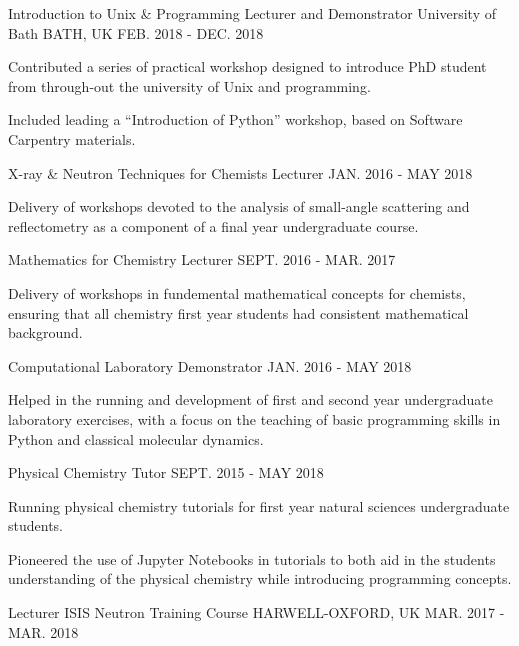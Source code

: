 \begin{cventries}
	\cventry
	{Introduction to Unix \& Programming Lecturer and Demonstrator}
	{University of Bath}
	{BATH, UK}
	{FEB. 2018 - DEC. 2018}
	{
		\begin{cvitems}
			\item {Contributed a series of practical workshop designed to introduce PhD student from through-out the university of Unix and programming.}
			\item {Included leading a ``Introduction of Python'' workshop, based on Software Carpentry materials. }
		\end{cvitems}
	}
	\cventry
	{X-ray \& Neutron Techniques for Chemists Lecturer}
	{}
	{}
	{JAN. 2016 - MAY 2018}
	{
		\begin{cvitems}
			\item {Delivery of workshops devoted to the analysis of small-angle scattering and reflectometry as a component of a final year undergraduate course.}
		\end{cvitems}
	}
	\cventry
	{Mathematics for Chemistry Lecturer}
	{}
	{}
	{SEPT. 2016 - MAR. 2017}
	{
		\begin{cvitems}
			\item {Delivery of workshops in fundemental mathematical concepts for chemists, ensuring that all chemistry first year students had consistent mathematical background.}
		\end{cvitems}
	}
	\cventry
	{Computational Laboratory Demonstrator}
	{}
	{}
	{JAN. 2016 - MAY 2018}
	{
		\begin{cvitems}
			\item {Helped in the running and development of first and second year undergraduate laboratory exercises, with a focus on the teaching of basic programming skills in Python and classical molecular dynamics.}
		\end{cvitems}
	}
	\cventry
	{Physical Chemistry Tutor}
	{}
	{}
	{SEPT. 2015 - MAY 2018}
	{
		\begin{cvitems}
			\item {Running physical chemistry tutorials for first year natural sciences undergraduate students.}
			\item {Pioneered the use of Jupyter Notebooks in tutorials to both aid in the students understanding of the physical chemistry while introducing programming concepts.}
		\end{cvitems}
	}
	\cventry
	{Lecturer}
	{ISIS Neutron Training Course}
	{HARWELL-OXFORD, UK}
	{MAR. 2017 - MAR. 2018}
	{
		\begin{cvitems}

\end{cvitems}}
\end{cventries}
